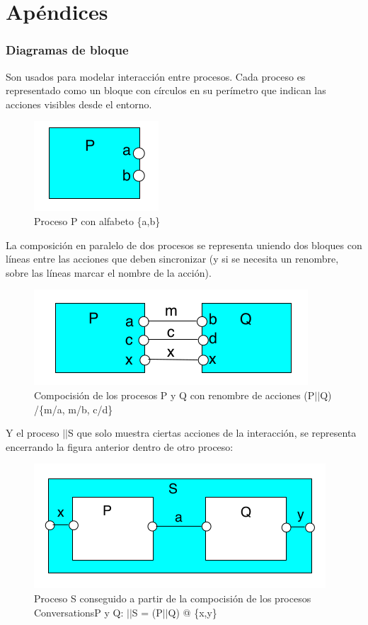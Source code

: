 \part{Apéndices}
\appendix

\section{Diagramas de bloque}
Son usados para modelar interacción entre procesos. Cada proceso es representado como un bloque con círculos en su perímetro que indican las acciones visibles desde el entorno.
\begin{figure}[h]
\centering
	\includegraphics[scale=0.5]{imagenes/bloque_proceso}
	\caption{Proceso P con alfabeto \{a,b\}}
\end{figure}

La composición en paralelo de dos procesos se representa uniendo dos bloques con líneas entre las acciones que deben sincronizar (y si se necesita un renombre, sobre las líneas marcar el nombre de la acción).

\begin{figure}[h]
\centering
	\includegraphics[scale=0.5]{imagenes/bloque_composicion}
	\caption{Compocisión de los procesos P y Q con renombre de acciones (P$||$Q) /\{m/a, m/b, c/d\}}
\end{figure}

Y el proceso $||$S que solo muestra ciertas acciones de la interacción, se representa encerrando la figura anterior dentro de otro proceso:

\begin{figure}[h]
\centering
	\includegraphics[scale=0.5]{imagenes/bloque-proceso-compuesto}
	\caption{Proceso S conseguido a partir de la compocisión de los procesos ConversationsP y Q: $||$S = (P$||$Q) @ \{x,y\}}
\end{figure}
